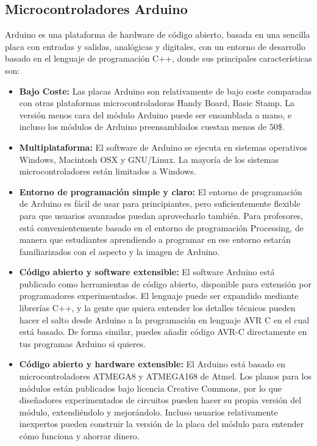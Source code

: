 \documentclass[12pt,a4paper]{article}
\begin{document}
\subsection{Microcontroladores Arduino}
Arduino\cite{ARDUINO} es una plataforma de hardware de código abierto, basada en una sencilla placa con entradas y salidas, analógicas y digitales, con un entorno de desarrollo basado en el lenguaje de programación C++, donde sus principales características son:
\begin{itemize}
	\item \textbf{Bajo Coste:} Las placas Arduino son relativamente de bajo coste comparadas con otras plataformas microcontroladoras Handy Board, Basic Stamp\textregistered. La versión menos cara del módulo Arduino puede ser ensamblada a mano, e incluso los módulos de Arduino preensamblados cuestan menos de 50\$.
	\item \textbf{Multiplataforma:} El software de Arduino se ejecuta en sistemas operativos Windows, Macintosh OSX y GNU/Linux. La mayoría de los sistemas microcontroladores están limitados a Windows.
	\item \textbf{Entorno de programación simple y claro:} El entorno de programación de Arduino es fácil de usar para principiantes, pero suficientemente flexible para que usuarios avanzados puedan aprovecharlo también. Para profesores, está convenientemente basado en el entorno de programación Processing, de manera que estudiantes aprendiendo a programar en ese entorno estarán familiarizados con el aspecto y la imagen de Arduino.
	\item \textbf{Código abierto y software extensible:} El software Arduino está publicado como herramientas de código abierto, disponible para extensión por programadores experimentados. El lenguaje puede ser expandido mediante librerías C++, y la gente que quiera entender los detalles técnicos pueden hacer el salto desde Arduino a la programación en lenguaje AVR C en el cual está basado. De forma similar, puedes añadir código AVR-C directamente en tus programas Arduino si quieres.
	\item \textbf{Código abierto y hardware extensible:} El Arduino está basado en microcontroladores ATMEGA8 y ATMEGA168 de Atmel. Los planos para los módulos están publicados bajo licencia Creative Commons, por lo que diseñadores experimentados de circuitos pueden hacer su propia versión del módulo, extendiéndolo y mejorándolo. Incluso usuarios relativamente inexpertos pueden construir la versión de la placa del módulo para entender cómo funciona y ahorrar dinero.
	
\end{itemize}
\end{document}
